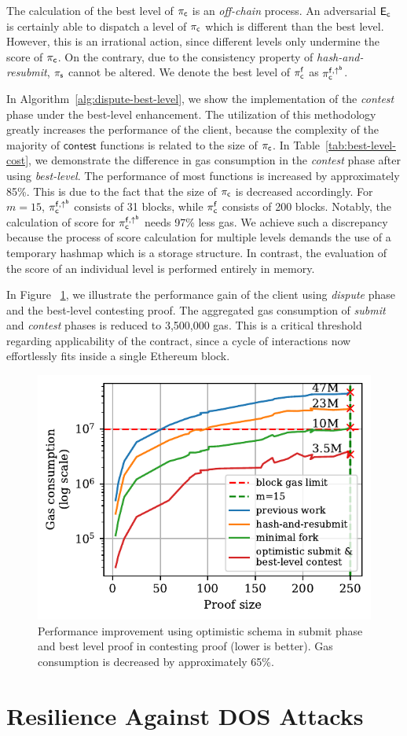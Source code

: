 The calculation of the best level of $\mathsf{\pi_{c}}$ is an \emph{off-chain} process.
An adversarial $\mathsf{E_{c}}$ is certainly able to dispatch a level of $\mathsf{\pi_{c}}$ which is
different than the best level. However, this is an irrational action, since
different levels only undermine the score of $\mathsf{\pi_{c}}$. On the contrary, due to
the consistency property of \emph{hash-and-resubmit}, $\mathsf{\pi_{s}}$ cannot be altered.
We denote the best level of $\mathsf{\pi_{c}^{f}}$ as $\mathsf{\pi_{c}^{f, \uparrow^{b}}}$.

In Algorithm~\ref{alg:dispute-best-level}, we show the implementation of the
\emph{contest} phase under the best-level enhancement. The utilization of
this methodology greatly increases the performance of the client,
because the complexity of the majority of $\textsf{contest}$ functions is
related to the size of $\mathsf{\pi_{c}}$. In Table~\ref{tab:best-level-cost}, we
demonstrate the difference in gas consumption in the \emph{contest} phase after
using \emph{best-level}. The performance of most functions is increased by
approximately 85\%. This is due to the fact that the size of $\mathsf{\pi_{c}}$ is
decreased accordingly. For $m=15$, $\mathsf{\pi_{c}^{f, \uparrow^{b}}}$ consists of 31 blocks, while
$\mathsf{\pi_{c}^{f}}$ consists of 200 blocks.  Notably, the calculation of score for $\mathsf{\pi_{c}^{f, \uparrow^{b}}}$
needs 97\% less gas. We achieve such a discrepancy because the process of score
calculation for multiple levels demands the use of a temporary hashmap which is
a storage structure. In contrast, the evaluation of the score of an individual level
is performed entirely in memory.



In Figure ~\ref{fig:dispute-best-level}, we illustrate the performance gain of
the client using \emph{dispute} phase and the best-level contesting proof. The
aggregated gas consumption of \emph{submit} and \emph{contest} phases is
reduced to 3,500,000 gas. This is a critical threshold regarding applicability of
the contract, since a cycle of interactions now effortlessly fits inside a
single Ethereum block.



\begin{figure}[!h]
    \begin{center}
        \includegraphics[width=0.6\columnwidth]{figures/dispute-best-level.pdf}
    \end{center}
    \caption{Performance improvement using optimistic schema in submit phase
        and best level proof in contesting proof (lower is better). Gas
        consumption is decreased by approximately 65\%.}
    \label{fig:dispute-best-level}
\end{figure}
\newpage

\section{Resilience Against DOS Attacks}
